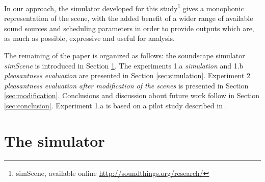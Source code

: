 \documentclass[twoside,twocolumn]{article}
\begin{document}
In our approach, the simulator developed for this study\footnote{simScene, available online \url{http://soundthings.org/research/}} gives a monophonic representation of the scene, with the added benefit of a wider range of available sound sources and scheduling parameters in order to provide outputs which are, as much as possible, expressive and useful for analysis.


The remaining of the paper is organized as follows: the soundscape simulator \emph{simScene} is introduced in Section \ref{sec:simulator}. The experiments  1.a \emph{simulation} and  1.b \emph{pleasantness evaluation} are presented in Section \ref{sec:simulation}. Experiment 2 \emph{pleasantness evaluation after modification of the scenes} is presented in Section \ref{sec:modification}. Conclusions and discussion about future work follow in Section \ref{sec:conclusion}. Experiment 1.a is based on a pilot study described in \cite{lafay2014new}.






\section{The simulator}
\label{sec:simulator}

\end{document}

